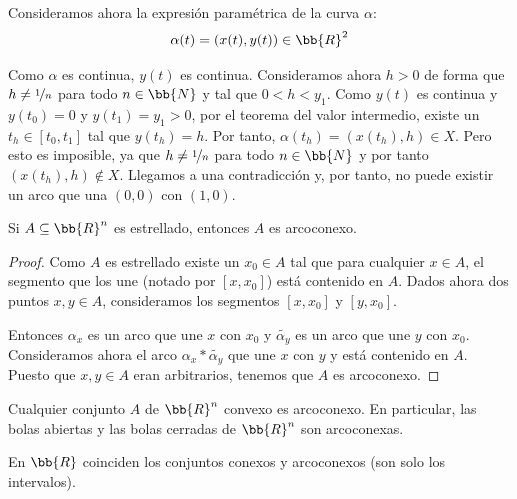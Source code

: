\begin{ejemplo}
    Consideramos ahora la expresión paramétrica de la curva $\alpha$:
    \begin{gather*}
        \alpha(t) = (x(t), y(t))\in \bb{R}^2
    \end{gather*}

    Como $\alpha$ es continua, $y(t)$ es continua. Consideramos ahora $h>0$ de forma que $h\neq \nicefrac{1}{n}$ para todo $n\in \bb{N}$ y tal que $0<h<y_1$. Como $y(t)$ es continua y $y(t_0)=0$ y $y(t_1) = y_1>0$, por el teorema del valor intermedio, existe un $t_h\in [t_0, t_1]$ tal que $y(t_h) = h$. Por tanto, $\alpha(t_h) = (x(t_h), h)\in X$. Pero esto es imposible, ya que $h\neq \nicefrac{1}{n}$ para todo $n\in \bb{N}$ y por tanto $(x(t_h), h)\notin X$. Llegamos a una contradicción y, por tanto, no puede existir un arco que una $(0,0)$ con $(1,0)$.
\end{ejemplo}

\begin{prop}
    Si $A\subseteq \bb{R}^n$ es estrellado, entonces $A$ es arcoconexo.
    \begin{proof}
        Como $A$ es estrellado existe un $x_0\in A$ tal que para cualquier $x\in A$, el segmento que los une (notado por $[x,x_0]$) está contenido en $A$. Dados ahora dos puntos $x,y\in A$, consideramos los segmentos $[x,x_0]$ y $[y,x_0]$.

        Entonces $\alpha_x$ es un arco que une $x$ con $x_0$ y $\tilde{\alpha_y}$ es un arco que une $y$ con $x_0$. Consideramos ahora el arco $\alpha_x\ast \tilde{\alpha_y}$ que une $x$ con $y$ y está contenido en $A$. Puesto que $x,y\in A$ eran arbitrarios, tenemos que $A$ es arcoconexo.
    \end{proof}
\end{prop}

\begin{coro}
    Cualquier conjunto $A$ de $\bb{R}^n$ convexo es arcoconexo. En particular, las bolas abiertas y las bolas cerradas de $\bb{R}^n$ son arcoconexas.
\end{coro}

\begin{coro}
    En $\bb{R}$ coinciden los conjuntos conexos y arcoconexos (son solo los intervalos).
\end{coro}

